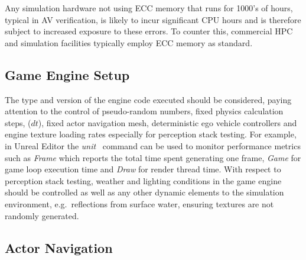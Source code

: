 Any simulation hardware not using ECC memory that runs for 1000's of hours, typical in AV verification, is likely to incur significant CPU hours and is therefore subject to increased exposure to these errors. To counter this, commercial HPC and simulation facilities typically employ ECC memory as standard.




\subsection{Game Engine Setup}
The type and version of the engine code executed should be considered, paying attention to the control of pseudo-random numbers, fixed physics calculation steps, ($dt$), fixed actor navigation mesh, deterministic ego vehicle controllers and engine texture loading rates especially for perception stack testing. 
%
For example, in Unreal Editor the \textit{unit}~\cite{stat_commands} command can be used to monitor performance metrics such as \textit{Frame} which reports the total time spent generating one frame, \textit{Game} for game loop execution time and \textit{Draw} for render thread time. 
%
With respect to perception stack testing, weather and lighting conditions in the game engine should be controlled as well as any other dynamic elements to the simulation environment, e.g.\ reflections from surface water, ensuring textures are not randomly generated. 






\subsection{Actor Navigation}
\DIFdelbegin {}\DIFdelend 

